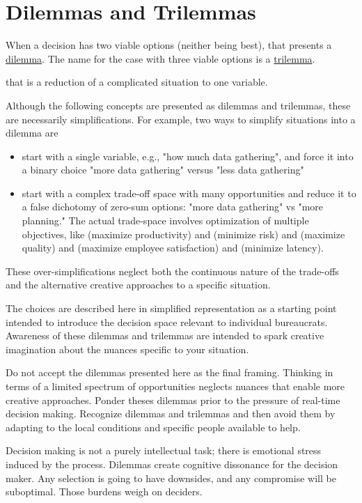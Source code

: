 \section{Dilemmas and Trilemmas\label{sec:dilemma_trilemma}}

When a decision has two viable options (neither being best), that presents a \href{https://en.wikipedia.org/wiki/Dilemma}{dilemma}. The name for the case with three viable options is a \href{https://en.wikipedia.org/wiki/Trilemma}{trilemma}. 

 that is a reduction of a complicated situation to one variable. 

Although the following concepts are presented as dilemmas and trilemmas, these are necessarily simplifications. For example, two ways to simplify situations into a dilemma are
\begin{itemize}
    \item start with a single variable, e.g., "how much data gathering", and force it into a binary choice "more data gathering" versus "less data gathering"
    \item start with a complex trade-off space with many opportunities and reduce it to a false dichotomy of zero-sum options: "more data gathering" vs "more planning." The actual trade-space involves optimization of multiple objectives, like (maximize productivity) and (minimize risk) and (maximize quality) and (maximize employee satisfaction) and (minimize latency). 
\end{itemize}
These over-simplifications neglect both the continuous nature of the trade-offs and the alternative creative approaches to a specific situation. 

The choices are described here in simplified representation as a starting point intended to introduce the decision space relevant to individual bureaucrats. Awareness of these dilemmas and trilemmas are intended to spark creative imagination about the nuances specific to your situation.

Do not accept the dilemmas presented here as the final framing. Thinking in terms of a limited spectrum of opportunities neglects nuances that enable more creative approaches. Ponder theses dilemmas prior to the pressure of real-time decision making.  Recognize dilemmas and trilemmas and then avoid them by adapting to the local conditions and specific people available to help.


Decision making is not a purely intellectual task; there is emotional stress induced by the process. Dilemmas create cognitive dissonance for the decision maker. Any selection is going to have downsides, and any compromise will be suboptimal. Those burdens weigh on deciders.

